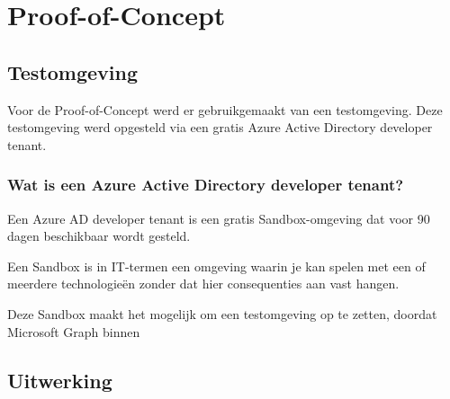 
\chapter{Proof-of-Concept}%
\label{ch:poc}

\section{Testomgeving}

Voor de Proof-of-Concept werd er gebruikgemaakt van een testomgeving. Deze testomgeving werd opgesteld via een gratis Azure Active Directory developer tenant. 

\subsection{Wat is een Azure Active Directory developer tenant?}

Een Azure \ac{AD} developer tenant is een gratis Sandbox-omgeving dat voor 90 dagen beschikbaar wordt gesteld. 

Een Sandbox is in IT-termen een omgeving waarin je kan spelen met een of meerdere technologieën zonder dat hier consequenties aan vast hangen.  

Deze Sandbox maakt het mogelijk om een testomgeving op te zetten, doordat Microsoft Graph binnen 




\section{Uitwerking}

